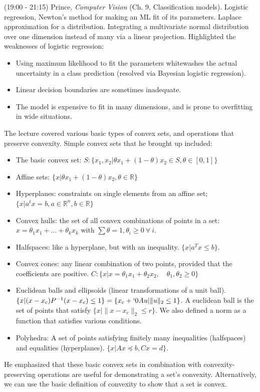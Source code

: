 \documentclass[idxtotoc,hyperref,openany]{labbook} %
\begin{document}
(19:00 - 21:15) Prince, \emph{Computer Vision} (Ch. 9, Classification models). Logistic regression, Newton's method for making an ML fit of its parameters. Laplace approximation for a distribution. Integrating a multivariate normal distribution over one dimension instead of many via a linear projection. Highlighted the weaknesses of logistic regression:
\begin{itemize}
\item Using maximum likelihood to fit the parameters whitewashes the actual uncertainty in a class prediction (resolved via Bayesian logistic regression).
\item Linear decision boundaries are sometimes inadequate.
\item The model is expensive to fit in many dimensions, and is prone to overfitting in wide situations.
\end{itemize}

The lecture covered various basic types of convex sets, and operations that preserve convexity. Simple convex sets that he brought up included:
\begin{itemize}
	\item The basic convex set: $S : \{x_1, x_2|\theta x_1 + (1 - \theta)x_2 \in S, \theta \in [0, 1]\}$
	\item Affine sets: $\{x | \theta x_1 + (1 - \theta)x_2, \theta \in \mathbb{R}\}$
	\item Hyperplanes: constraints on single elements from an affine set; $\{x | a^t x = b, a \in \mathbb{R}^n, b \in \mathbb{R}\}$
	\item Convex hulls: the set of all convex combinations of points in a set: $x = \theta_1 x_1 + ... + \theta_k x_k$ with $\sum \theta = 1, \theta_i \geq 0 \ \forall \ i$.
	\item Halfspaces: like a hyperplane, but with an inequality. $\{x | a^T x \leq b\}$.
	\item Convex cones: any linear combination of two points, provided that the coefficients are positive. $C : \{x|x = \theta_1 x_1 + \theta_2 x_2, \quad \theta_1, \theta_2 \geq 0\}$
	\item Euclidean balls and ellipsoids (linear transformations of a unit ball). $\{x | (x - x_c)P^{-1}(x - x_c) \leq 1\} = \{x_c + `	0Au | \|u\|_2 \leq 1\}$. A euclidean ball is the set of points that satisfy $\{x| \|x - x_c\|_2 \leq r\}$. We also defined a norm as a function that satisfies various conditions.
	\item Polyhedra: A set of points satisfying finitely many inequalities (halfspaces) and equalities (hyperplanes). $\{x|Ax \preceq b, Cx = d\}$.
\end{itemize}
He emphasized that these basic convex sets in combination with convexity-preserving operations are useful for demonstrating a set's convexity. Alternatively, we can use the basic definition of convexity to show that a set is convex.
\end{document}
